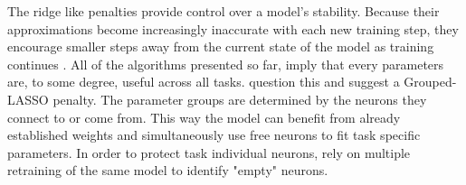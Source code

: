 The ridge like penalties provide control over a model's stability. Because their approximations become increasingly inaccurate with each new training step, they encourage smaller steps away from the current state of the model as training continues \cite{yin2021optimizationgeneralizationregularizationbasedcontinual}. All of the algorithms presented so far, imply that every parameters are, to some degree, useful across all tasks. \cite{jung2021continuallearningnodeimportancebased, yoon2018lifelonglearningdynamicallyexpandable} question this and suggest a Grouped-LASSO \cite{Fahrmeir_2022} penalty. The parameter groups are determined by the neurons they connect to or come from. This way the model can benefit from already established weights and simultaneously use free neurons to fit task specific parameters. In order to protect task individual neurons, \cite{yoon2018lifelonglearningdynamicallyexpandable} rely on multiple retraining of the same model to identify "empty" neurons. \\
